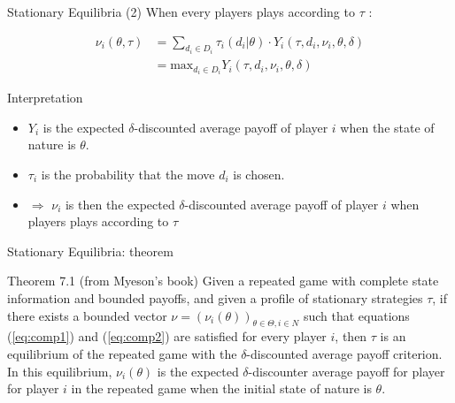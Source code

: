 \begin{frame}{Stationary Equilibria (2)}
    When every players plays according to $\tau$ :

    \begin{small}
        \begin{align}
            \nu_i(\theta, \tau) &= \sum_{d_i \in D_i} \tau_i(d_i|\theta) \cdot
            Y_i(\tau, d_i, \nu_i, \theta, \delta) \label{eq:comp1} \\
            &= \text{max}_{d_i \in D_i} Y_i(\tau, d_i, \nu_i, \theta, \delta)
            \label{eq:comp2}
        \end{align}
    \end{small}

    \begin{exampleblock}{Interpretation}
        \begin{itemize}
            \item $Y_i$ is the expected $\delta$-discounted average payoff of player $i$ when the
            state of nature is $\theta$.
            \item $\tau_i$ is the probability that the move $d_i$ is chosen.
            \item $\Rightarrow$ $\nu_i$ is then the expected $\delta$-discounted average payoff of
            player $i$ when players plays according to $\tau$
        \end{itemize}
    \end{exampleblock}
\end{frame}

\begin{frame}{Stationary Equilibria: theorem}
    \begin{block}{Theorem 7.1 (from Myeson's book)}
	    Given a repeated game with complete state information and bounded payoffs, and given a
        profile of stationary strategies $\tau$, if there exists a bounded vector
        $\nu = (\nu_i(\theta))_{\theta \in \Theta, i \in N}$ such that equations (\ref{eq:comp1})
        and (\ref{eq:comp2}) are satisfied for every player $i$, then $\tau$ is an equilibrium
        of the repeated game with the $\delta$-discounted average payoff criterion. In this
        equilibrium, $\nu_i(\theta)$ is the expected $\delta$-discounter average payoff for player
        for player $i$ in the repeated game when the initial state of nature is $\theta$.
    \end{block}
\end{frame}

